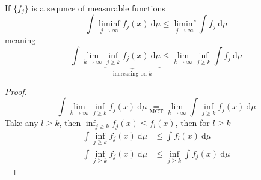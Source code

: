 \begin{lemma}
  If $\{f_j\}$ is a sequnce of measurable functions
  \[\int\liminf_{j\to\infty}f_j(x)\ \mathrm{d}\mu \le \liminf_{j\to\infty}\int f_j \ \mathrm{d}\mu\] 
  meaning 
  \[\int\lim_{k\to\infty} \underbrace{\inf_{j\ge k}f_j(x)\ \mathrm{d}\mu}_{\text{increasing on }k} \le \lim_{k\to\infty}\inf_{j\ge k}\int f_j \ \mathrm{d}\mu\] 
\end{lemma}
\begin{proof}
  \[\int\lim_{k\to\infty} \inf_{j\ge k}f_j(x)\ \mathrm{d}\mu \underset{\text{MCT}}= \lim_{k \to \infty} \int \inf_{j \ge k}f_j(x) \ \mathrm{d}\mu \]
  Take any $l \ge k$, then $\inf_{j \ge k}f_j(x) \le f_l(x)$, then for $l \ge k$
  \begin{align*}
    \int\inf_{j\ge k}f_j(x)\ \mathrm{d}\mu &\le \int f_l(x)\ \mathrm{d}\mu \\
    \int \inf_{j\ge k}f_j(x)\ \mathrm{d}\mu &\le \inf_{j\ge k}\int f_j(x)\ \mathrm{d}\mu
  \end{align*}
\end{proof}